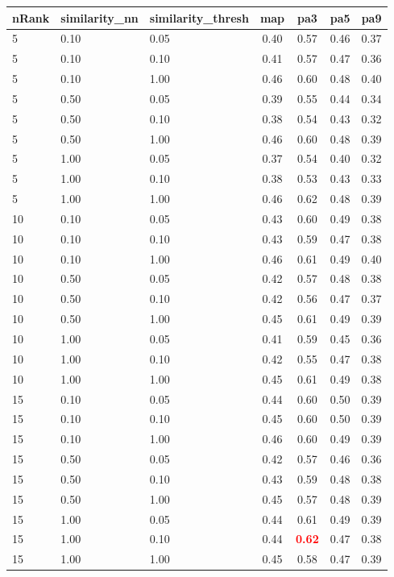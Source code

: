 \begin{tabular}{lllcccc} 
nRank & similarity\_nn & similarity\_thresh & map & pa3 & pa5 & pa9 \\ 
\hline 
 5 & 0.10 & 0.05 & 0.40 & 0.57 & 0.46 & 0.37 \\ 
 5 & 0.10 & 0.10 & 0.41 & 0.57 & 0.47 & 0.36 \\ 
 5 & 0.10 & 1.00 & 0.46 & 0.60 & 0.48 & 0.40 \\ 
 5 & 0.50 & 0.05 & 0.39 & 0.55 & 0.44 & 0.34 \\ 
 5 & 0.50 & 0.10 & 0.38 & 0.54 & 0.43 & 0.32 \\ 
 5 & 0.50 & 1.00 & 0.46 & 0.60 & 0.48 & 0.39 \\ 
 5 & 1.00 & 0.05 & 0.37 & 0.54 & 0.40 & 0.32 \\ 
 5 & 1.00 & 0.10 & 0.38 & 0.53 & 0.43 & 0.33 \\ 
 5 & 1.00 & 1.00 & 0.46 & 0.62 & 0.48 & 0.39 \\ 
10 & 0.10 & 0.05 & 0.43 & 0.60 & 0.49 & 0.38 \\ 
10 & 0.10 & 0.10 & 0.43 & 0.59 & 0.47 & 0.38 \\ 
10 & 0.10 & 1.00 & 0.46 & 0.61 & 0.49 & 0.40 \\ 
10 & 0.50 & 0.05 & 0.42 & 0.57 & 0.48 & 0.38 \\ 
10 & 0.50 & 0.10 & 0.42 & 0.56 & 0.47 & 0.37 \\ 
10 & 0.50 & 1.00 & 0.45 & 0.61 & 0.49 & 0.39 \\ 
10 & 1.00 & 0.05 & 0.41 & 0.59 & 0.45 & 0.36 \\ 
10 & 1.00 & 0.10 & 0.42 & 0.55 & 0.47 & 0.38 \\ 
10 & 1.00 & 1.00 & 0.45 & 0.61 & 0.49 & 0.38 \\ 
15 & 0.10 & 0.05 & 0.44 & 0.60 & 0.50 & 0.39 \\ 
15 & 0.10 & 0.10 & 0.45 & 0.60 & 0.50 & 0.39 \\ 
15 & 0.10 & 1.00 & 0.46 & 0.60 & 0.49 & 0.39 \\ 
15 & 0.50 & 0.05 & 0.42 & 0.57 & 0.46 & 0.36 \\ 
15 & 0.50 & 0.10 & 0.43 & 0.59 & 0.48 & 0.38 \\ 
15 & 0.50 & 1.00 & 0.45 & 0.57 & 0.48 & 0.39 \\ 
15 & 1.00 & 0.05 & 0.44 & 0.61 & 0.49 & 0.39 \\ 
15 & 1.00 & 0.10 & 0.44 & \textbf{\textcolor{red}{0.62}} & 0.47 & 0.38 \\ 
15 & 1.00 & 1.00 & 0.45 & 0.58 & 0.47 & 0.39 \\ 

\end{tabular}
